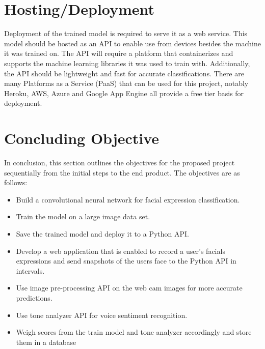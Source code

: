 \section{Hosting/Deployment}
Deployment of the trained model is required to serve it as a web service. This model should be hosted as an API to enable use from devices besides the machine it was trained on. The API will require a platform that containerizes and supports the machine learning libraries it was used to train with. Additionally, the API should be lightweight and fast for accurate classifications. There are many Platforms as a Service (PaaS) that can be used for this project, notably Heroku, AWS, Azure and Google App Engine all provide a free tier basis for deployment.


\section{Concluding Objective}
In conclusion, this section outlines the objectives for the proposed project sequentially from the initial steps to the end product. The objectives are as follows:

\begin{itemize}
	\item Build a convolutional neural network for facial expression classification.
	\item Train the model on a large image data set.
	\item Save the trained model and deploy it to a Python API.
	\item Develop a web application that is enabled to record a user's facials expressions and send snapshots of the users face to the Python API in intervals.
	\item Use image pre-processing API on the web cam images for more accurate predictions.
	\item Use tone analyzer API for voice sentiment recognition.
	\item Weigh scores from the train model and tone analyzer accordingly and store them in a database
\end{itemize}

